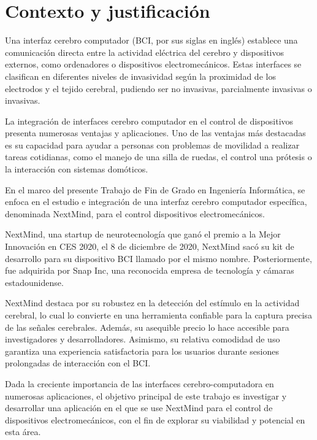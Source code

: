 \section{Contexto y justificación}

Una interfaz cerebro computador (BCI, por sus siglas en inglés) establece una comunicación directa entre la actividad eléctrica del cerebro y dispositivos externos, como ordenadores o dispositivos electromecánicos. Estas interfaces se clasifican en diferentes niveles de invasividad según la proximidad de los electrodos y el tejido cerebral, pudiendo ser no invasivas, parcialmente invasivas o invasivas.

\bigskip

La integración de interfaces cerebro computador en el control de dispositivos presenta numerosas ventajas y aplicaciones. Uno de las ventajas más destacadas es su capacidad para ayudar a personas con problemas de movilidad a realizar tareas cotidianas, como el manejo de una silla de ruedas, el control una prótesis o la interacción con sistemas domóticos.

\bigskip

En el marco del presente Trabajo de Fin de Grado en Ingeniería Informática, se enfoca en el estudio e integración de una interfaz cerebro computador específica, denominada NextMind, para el control dispositivos electromecánicos. 

\bigskip

NextMind, una startup de neurotecnología que ganó el premio a la Mejor Innovación en CES 2020, el 8 de diciembre de 2020, NextMind sacó su kit de desarrollo para su dispositivo BCI llamado por el mismo nombre. \cite{BusinessWire2020} Posteriormente, fue adquirida por Snap Inc, una reconocida empresa de tecnología y cámaras estadounidense. \cite{SnapInc} 

\bigskip

NextMind destaca por su robustez en la detección del estímulo en la actividad cerebral, lo cual lo convierte en una herramienta confiable para la captura precisa de las señales cerebrales. Además, su asequible precio lo hace accesible para investigadores y desarrolladores. Asimismo, su relativa comodidad de uso garantiza una experiencia satisfactoria para los usuarios durante sesiones prolongadas de interacción con el BCI.

\bigskip

Dada la creciente importancia de las interfaces cerebro-computadora en numerosas aplicaciones, el objetivo principal de este trabajo es investigar y desarrollar una aplicación en el que se use NextMind para el control de dispositivos electromecánicos, con el fin de explorar su viabilidad y potencial en esta área.